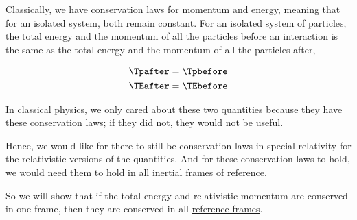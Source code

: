 Classically, we have conservation laws for momentum and energy, meaning that for an isolated system, both remain constant.
For an isolated system of particles, the total energy and the momentum of all the particles before an interaction is the same as the total energy and the momentum of all the particles after,

\begin{equation}
	\begin{aligned}
		 \Tpafter  & = \Tpbefore  \\
		 \TEafter  & = \TEbefore
	\end{aligned}
\end{equation}

In classical physics, we only cared about these two quantities because they have these conservation laws; if they did not, they would not be useful.

Hence, we would like for there to still be conservation laws in special relativity for the relativistic versions of the quantities.
And for these conservation laws to hold, we would need them to hold in all inertial frames of reference.

So we will show that if the total energy and relativistic momentum are conserved in one frame, then they are conserved in all \hyperlink{def-Reference-frame}{reference frames}.

